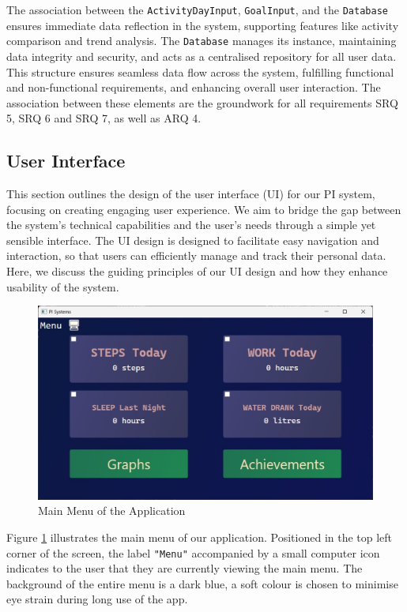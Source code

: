 \documentclass[11pt]{article}
\begin{document}
The association between the \texttt{ActivityDayInput}, \texttt{GoalInput}, and the \texttt{Database}
ensures immediate data reflection in the system, supporting features like
activity comparison and trend analysis. The \texttt{Database} manages its instance,
maintaining data integrity and security, and acts as a centralised repository
for all user data. This structure ensures seamless data flow across the system,
fulfilling functional and non-functional requirements, and enhancing overall
user interaction. The association between these elements are the groundwork for all requirements SRQ 5, SRQ 6 and SRQ 7, as well as ARQ 4.\par

\newpage

\subsection{User Interface}

This section outlines the design of the user interface (UI) for our PI system,
focusing on creating engaging user experience. We aim to bridge
the gap between the system's technical capabilities and the user's needs through
a simple yet sensible interface. The UI design is designed to facilitate easy
navigation and interaction, so that users can efficiently manage and track
their personal data. Here, we discuss the guiding principles of our UI design and
how they enhance usability of the system.\par

\begin{figure}[!ht]
  \centering
  \includegraphics[width = 0.5\linewidth]{Main Menu}
  \caption{Main Menu of the Application}
  \label{fig:Menu}
\end{figure}

Figure \ref{fig:Menu} illustrates the main menu of our application. Positioned in the top left
corner of the screen, the label \texttt{"Menu"} accompanied by a small computer icon indicates
to the user that they are currently viewing the main menu. The background of the 
entire menu is a dark blue, a soft colour is chosen to minimise eye strain during 
long use of the app.\par
\end{document}
